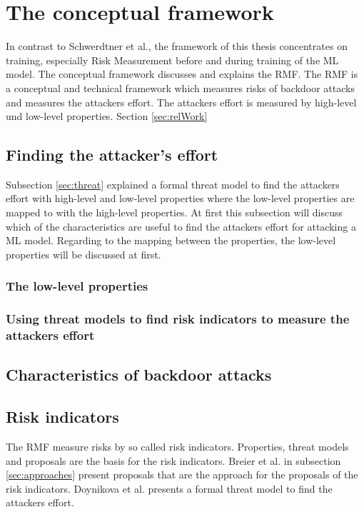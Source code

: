 \section{The conceptual framework}
\label{sec:conFrame}

In contrast to Schwerdtner et al., the framework of this thesis concentrates on training, especially Risk Measurement before and during training of the ML model.
The conceptual framework discusses and explains the RMF. The RMF is a conceptual and technical framework which measures risks of backdoor attacks and measures the attackers effort. The attackers effort is measured by high-level und low-level properties. Section \ref{sec:relWork}

\subsection{Finding the attacker's effort}

Subsection \ref{sec:threat} explained a formal threat model to find the attackers effort with high-level and low-level properties where the low-level properties are mapped to with the high-level properties. At first this subsection will discuss which of the characteristics are useful to find the attackers effort for attacking a ML model. Regarding to the mapping between the properties, the low-level properties will be discussed at first.

\subsubsection*{The low-level properties}



\subsubsection*{Using threat models to find risk indicators to measure the attackers effort}

\subsection{Characteristics of backdoor attacks}

\subsection{Risk indicators}
\label{sec:risk_indicators}

The RMF measure risks by so called risk indicators. Properties, threat models and proposals are the basis for the risk indicators. Breier et al. in subsection \ref{sec:approaches} present
proposals that are the approach for the proposals of the risk indicators. Doynikova et al. presents a formal threat model to find the attackers effort.
